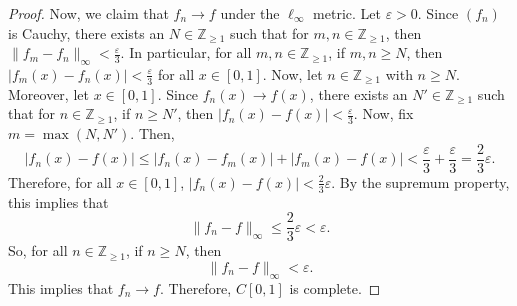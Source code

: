 \documentclass[a4paper, openany]{memoir}
\theoremstyle{definition}
\theoremstyle{plain}
\begin{document}
\begin{proof}
    \noindent Now, we claim that $f_n \to f$ under the $\ell_\infty$ metric. Let $\varepsilon > 0$. Since $(f_n)$ is Cauchy, there exists an $N \in \mathbb{Z}_{\geq 1}$ such that for $m, n \in \mathbb{Z}_{\geq 1}$, then $\lVert f_m - f_n \rVert_\infty < \frac{\varepsilon}{3}$. In particular, for all $m, n \in \mathbb{Z}_{\geq 1}$, if $m, n \geq N$, then $|f_m(x) - f_n(x)| < \frac{\varepsilon}{3}$ for all $x \in [0, 1]$. Now, let $n \in \mathbb{Z}_{\geq 1}$ with $n \geq N$. Moreover, let $x \in [0, 1]$. Since $f_n(x) \to f(x)$, there exists an $N' \in \mathbb{Z}_{\geq 1}$ such that for $n \in \mathbb{Z}_{\geq 1}$, if $n \geq N'$, then $|f_n(x) - f(x)| < \frac{\varepsilon}{3}$. Now, fix $m = \max(N, N')$. Then,
    \[|f_n(x) - f(x)| \leq |f_n(x) - f_m(x)| + |f_m(x) - f(x)| < \frac{\varepsilon}{3} + \frac{\varepsilon}{3} = \frac{2}{3} \varepsilon.\]
    Therefore, for all $x \in [0, 1]$, $|f_n(x) - f(x)| < \frac{2}{3} \varepsilon$. By the supremum property, this implies that
    \[\lVert f_n - f \rVert_\infty \leq \frac{2}{3} \varepsilon < \varepsilon.\]
    So, for all $n \in \mathbb{Z}_{\geq 1}$, if $n \geq N$, then
    \[\lVert f_n - f \rVert_\infty < \varepsilon.\]
    This implies that $f_n \to f$. Therefore, $C[0, 1]$ is complete.
\end{proof}
\end{document}
